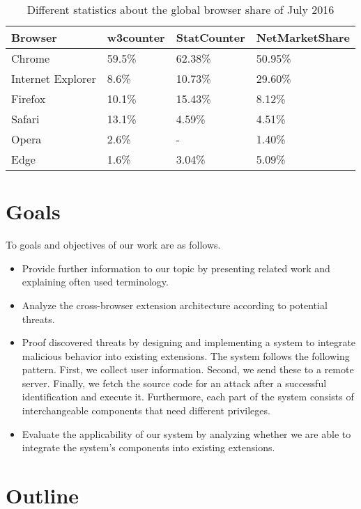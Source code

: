 	\begin{table}
		\centering
		\begin{tabular}{|l|l|l|l|}
			\hline
			\textbf{Browser} & \textbf{w3counter} & \textbf{StatCounter} & \textbf{NetMarketShare} \\ \hline
			Chrome & 59.5\% & 62.38\% & 50.95\% \\ \hline
			Internet Explorer & 8.6\% & 10.73\% & 29.60\% \\ \hline
			Firefox & 10.1\% & 15.43\% & 8.12\% \\ \hline
			Safari & 13.1\% & 4.59\% & 4.51\% \\  \hline
			Opera & 2.6\% & - & 1.40\% \\ \hline
			Edge & 1.6\% & 3.04\% & 5.09\% \\ \hline
		\end{tabular}
		\caption{Different statistics about the global browser share of July 2016 \cite{w3browserStats, statcounter, netmarketshare}}
		\label{tab:browserShare}
	\end{table}	
	
\section{Goals}
	
	To goals and objectives of our work are as follows.
	\begin{itemize}[nosep]
		\item Provide further information to our topic by presenting related work and explaining often used terminology.
		\item Analyze the cross-browser extension architecture according to potential threats.
		\item Proof discovered threats by designing and implementing a system to integrate malicious behavior into existing extensions. The system follows the following pattern. First, we collect user information. Second, we send these to a remote server. Finally, we fetch the source code for an attack after a successful identification and execute it. Furthermore, each part of the system consists of interchangeable components that need different privileges.
		\item Evaluate the applicability of our system by analyzing whether we are able to integrate the system's components into existing extensions. 
	\end{itemize}

\section{Outline}
	
